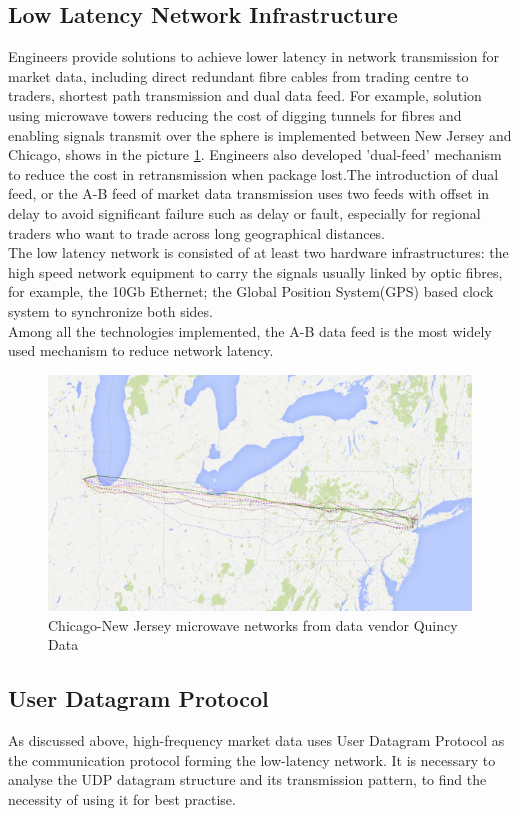 \documentclass[11pt,openright,a4paper]{report}
\begin{document}
\subsection{Low Latency Network Infrastructure}
Engineers provide solutions to achieve lower latency in network transmission for market data, including direct redundant fibre cables from trading centre to traders, shortest path transmission and dual data feed. For example, solution using microwave towers reducing the cost of digging tunnels for fibres and enabling signals transmit over the sphere is implemented between New Jersey and Chicago\cite{htfbackyard}, shows in the picture \ref{fig:2}. Engineers also developed 'dual-feed' mechanism to reduce the cost in retransmission when package lost\cite{zusman1999fault}.The introduction of dual feed, or the A-B feed of market data transmission uses two feeds with offset in delay to avoid significant failure such as delay or fault, especially for regional traders who want to trade across long geographical distances. \\
The low latency network is consisted of at least two hardware infrastructures: the high speed network equipment to carry the signals usually linked by optic fibres, for example, the 10Gb Ethernet; the Global Position System(GPS) based clock system to synchronize both sides\cite{brook2015low}.\\
Among all the technologies implemented, the A-B data feed is the most widely used mechanism to reduce network latency.\\
\begin{figure}[H]
	\centering\includegraphics[width=0.7\linewidth]{picture/newyork-chicago.jpg}
	\caption{Chicago-New Jersey microwave networks from data vendor Quincy Data}
	\label{fig:2}
\end{figure}
\subsection{User Datagram Protocol}
As discussed above, high-frequency market data uses User Datagram Protocol as the communication protocol forming the low-latency network. It is necessary to analyse the UDP datagram structure and its transmission pattern, to find the necessity of using it for best practise.\\
\end{document}
